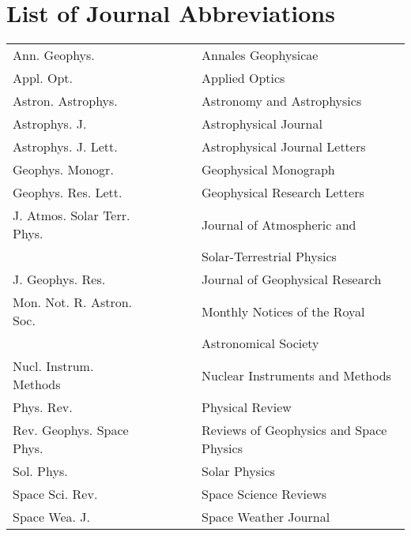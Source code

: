 
\chapter*{List of Journal Abbreviations}

\thispagestyle{myheadings}

\begin{center}
  \begin{longtable}{lll}
	Ann. Geophys. & ~~~~~ & Annales Geophysicae \\
	Appl. Opt. & ~~~~~ & Applied Optics \\
	Astron. Astrophys. & ~~~~~ & Astronomy and Astrophysics \\
    Astrophys. J. & ~~~~~ & Astrophysical Journal \\
    Astrophys. J. Lett.  & ~~~~~ & Astrophysical Journal Letters \\
    Geophys. Monogr. & ~~~~~ & Geophysical Monograph \\
    Geophys. Res. Lett. & ~~~~~ & Geophysical Research Letters \\
    J. Atmos. Solar Terr. Phys. & ~~~~~ & Journal of Atmospheric and \\
    ~ & ~ &Solar-Terrestrial Physics \\
    J. Geophys. Res. & ~~~~~ & Journal of Geophysical Research \\
    Mon. Not. R. Astron. Soc. & ~~~~~ & Monthly Notices of the Royal \\
    ~ & ~ & Astronomical Society \\
	Nucl. Instrum. Methods  & ~~~~~ & Nuclear Instruments and Methods \\
	Phys. Rev. & ~~~~~ & Physical Review \\
	Rev. Geophys. Space Phys. & ~~~~~ & Reviews of Geophysics and Space Physics \\
	Sol. Phys.  & ~~~~~ &  Solar Physics \\
	Space Sci. Rev. & ~~~~~ & Space Science Reviews \\
	Space Wea. J. & ~~~~~ & Space Weather Journal \\
  \end{longtable}
\end{center}
